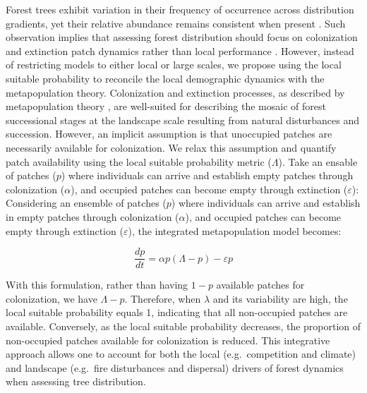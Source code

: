 Forest trees exhibit variation in their frequency of occurrence across
distribution gradients, yet their relative abundance remains consistent
when present \citep{Canham2010}. Such observation implies that assessing
forest distribution should focus on colonization and extinction patch
dynamics rather than local performance \citep{Canham2017}. However,
instead of restricting models to either local or large scales, we
propose using the local suitable probability to reconcile the local
demographic dynamics with the metapopulation theory. Colonization and
extinction processes, as described by metapopulation theory
\citep{Levins1969}, are well-suited for describing the mosaic of forest
successional stages at the landscape scale resulting from natural
disturbances and succession. However, an implicit assumption is that
unoccupied patches are necessarily available for colonization. We relax
this assumption and quantify patch availability using the local suitable
probability metric (\(\Lambda\)). Take an ensable of patches (\(p\))
where individuals can arrive and establish empty patches through
colonization (\(\alpha\)), and occupied patches can become empty through
extinction (\(\varepsilon\)): Considering an ensemble of patches (\(p\))
where individuals can arrive and establish in empty patches through
colonization (\(\alpha\)), and occupied patches can become empty through
extinction (\(\varepsilon\)), the integrated metapopulation model
becomes:

\[
\frac{dp}{dt} = \alpha p (\Lambda - p) - \varepsilon p
\]

With this formulation, rather than having \(1 - p\) available patches
for colonization, we have \(\Lambda - p\). Therefore, when \(\lambda\)
and its variability are high, the local suitable probability equals 1,
indicating that all non-occupied patches are available. Conversely, as
the local suitable probability decreases, the proportion of non-occupied
patches available for colonization is reduced. This integrative approach
allows one to account for both the local (e.g.~competition and climate)
and landscape (e.g.~fire disturbances and dispersal) drivers of forest
dynamics when assessing tree distribution.

\newpage

\singlespacing
{\renewcommand{\bibname}{References}
\renewcommand{\bibsection}{\section{\bibname}}
}

